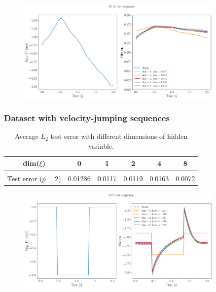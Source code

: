 \begin{figure}[H]
    \centering
    \includegraphics[width=0.9\textwidth]{images/FGBurigede2_fixed.png}
    \label{fig:FGBurigede2Fixed}
\end{figure}

\subsubsection{Dataset with velocity-jumping sequences}
\begin{table}[H]
    \centering
    \begin{tabular}{c|ccccc}
        \hline
        dim($\xi$) & 0 & 1 & 2 & 4 & 8\\
        \hline \\[-1em]
        Test error ($p=2$) & 0.01286  & 0.0117 & 0.0119 & 0.0163 & 0.0072\\
        \hline
    \end{tabular}
    \caption{Average $L_2$ test error with different dimensions of hidden variable.}
    \label{tab:resFGJumpFixed}
\end{table}
\begin{figure}[H]
    \centering
    \includegraphics[width=0.9\textwidth]{images/FGJump1_fixed.png}
    \label{fig:FGJump1Fixed}
\end{figure}

